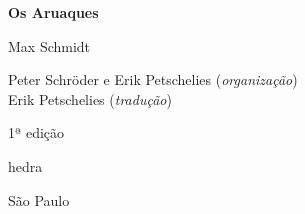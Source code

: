 




\begingroup\thispagestyle{empty}\vspace*{.05\textheight} 

              \formular
              \Huge
              \noindent
              \textbf{Os Aruaques}

              \bigskip  
              
              \LARGE
              \noindent
              Max Schmidt
              \vspace{6.8em}

              
              \newfontfamily{}
              {\selectfont\minion\small\noindent Peter Schröder e Erik Petschelies (\textit{organização})\\
              Erik Petschelies (\textit{tradução})}


              \noindent
              {\selectfont\minion\small\noindent 1ª edição}

              \vfill

              \newfontfamily{}
              {\fontsize{30}{40}\selectfont \timesnewroman hedra}

              {\selectfont\minion\small
              São Paulo \quad\the\year}

\endgroup
\pagebreak
